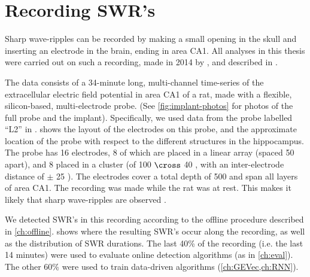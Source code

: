 \section{Recording SWR's}
\label{sec:recording}

Sharp wave-ripples can be recorded by making a small opening in the skull and inserting an electrode in the brain, ending in area CA1. All analyses in this thesis were carried out on such a recording, made in 2014 by \citeauthor*{Michon2016}, and described in \cite{Michon2016}.

The data consists of a 34-minute long, multi-channel time-series of the extracellular electric field potential in area CA1 of a rat, made with a flexible, silicon-based, multi-electrode probe. (See \cref{fig:implant-photos} for photos of the full probe and the implant). Specifically, we used data from the probe labelled ``L2'' in \cite{Michon2016}.  shows the layout of the electrodes on this probe, and the approximate location of the probe with respect to the different structures in the hippocampus. The probe has 16 electrodes, 8 of which are placed in a linear array (spaced 50 \um{} apart), and 8 placed in a cluster (of 100 \um{} $\cross$ 40 \um{}, with an inter-electrode distance of $\pm$ 25 \um{}). The electrodes cover a total depth of 500 \um{} and span all layers of area CA1.
The recording was made while the rat was at rest. This makes it likely that  sharp wave-ripples are observed \cite{Buzsaki2015}. 


We detected SWR's in this recording according to the offline procedure described in \cref{ch:offline}.  shows where the resulting SWR's occur along the recording, as well as the distribution of SWR durations. The last 40\% of the recording (i.e. the last 14 minutes) were used to evaluate online detection algorithms (as in \cref{ch:eval}). The other 60\% were used to train data-driven algorithms (\cref{ch:GEVec,ch:RNN}).\footnotemark{}


\begin{figure}
 \\[0.8em]
 
\label{fig:SWR-stats}
\end{figure}
